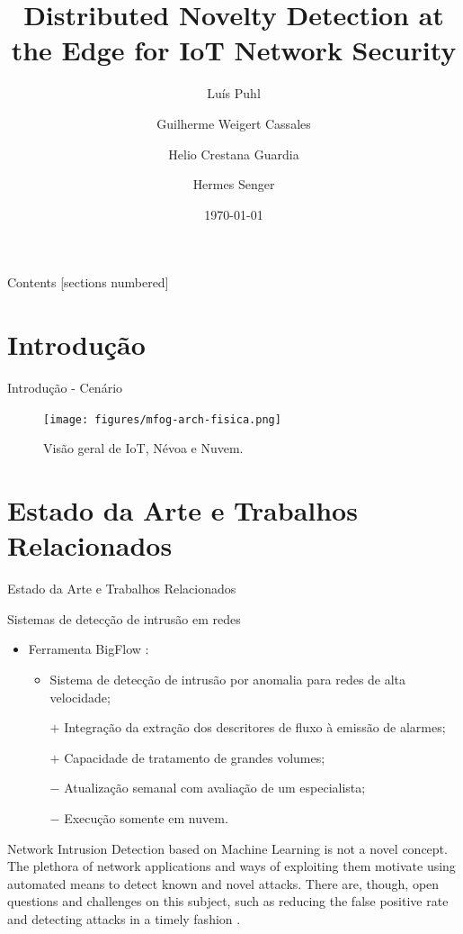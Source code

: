 \documentclass[aspectratio=1610,10pt]{beamer}
\title[]{Distributed Novelty Detection at the Edge for IoT Network Security}
\author{Luís Puhl \and Guilherme Weigert Cassales \and Helio Crestana Guardia \and Hermes Senger}
\institute{Universidade Federal de São Carlos, Brasil\\\url{https://www2.ufscar.br/}}
\date{\today}
\begin{document}
\maketitle

\begin{frame}[noframenumbering]{Contents}
  [sections numbered]
  \tableofcontents[hideallsubsections]
\end{frame}

\section{Introdução}
\begin{frame}{Introdução - Cenário}
  \begin{figure}\centering
    \texttt{[image: figures/mfog-arch-fisica.png]}
    \caption{Visão geral de IoT, Névoa e Nuvem.}
  \end{figure}
\end{frame}

\section{Estado da Arte e Trabalhos Relacionados}
\begin{frame}[fragile]{Estado da Arte e Trabalhos Relacionados}
\begin{alertblock}{Sistemas de detecção de intrusão em redes}
  \begin{itemize}%
    \item Ferramenta BigFlow \cite{Viegas2019}:
    \begin{itemize}
      \item Sistema de detecção de intrusão por anomalia para redes de alta velocidade;
      \item[$\boldsymbol{+}$] Integração da extração dos descritores de fluxo à emissão de alarmes;
      \item[$\boldsymbol{+}$] Capacidade de tratamento de grandes volumes;
      \item[$\boldsymbol{-}$] Atualização semanal com avaliação de um especialista;
      \item[$\boldsymbol{-}$] Execução somente em nuvem.
    \end{itemize}
  \end{itemize}
\end{alertblock}

Network Intrusion Detection based on Machine Learning is not a novel concept.
The plethora of network applications and ways of exploiting them motivate using automated means to detect known and novel attacks. 
There are, though, open questions and challenges on this subject, such as
reducing the false positive rate and detecting attacks in a timely fashion \cite{DaCosta2019a}.

\end{frame}
\end{document}
